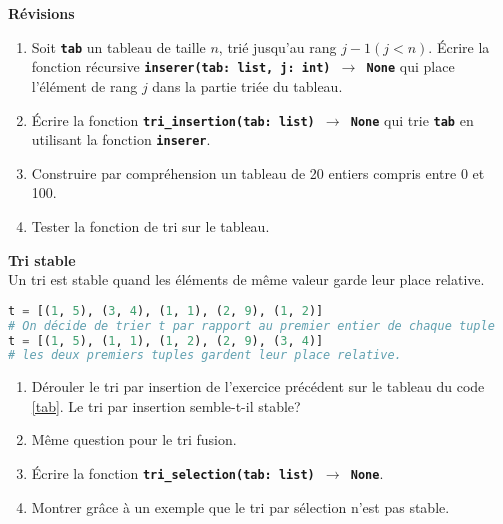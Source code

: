 \documentclass[a4paper,11pt]{article}
\begin{document}
\begin{exo}
    \textbf{Révisions}
    \begin{enumerate}
        \item Soit \textbf{\texttt{tab}} un tableau de taille $n$, trié jusqu'au rang $j-1 (j<n)$. Écrire la fonction récursive \textbf{\texttt{inserer(tab: list, j: int) $\rightarrow$ None}} qui place l'élément de rang $j$ dans la partie triée du tableau.
        \item Écrire la fonction \textbf{\texttt{tri\_insertion(tab: list) $\rightarrow$ None}} qui trie \textbf{\texttt{tab}} en utilisant la fonction \textbf{\texttt{inserer}}.
        \item Construire par compréhension un tableau de 20 entiers compris entre 0 et 100.
        \item Tester la fonction de tri sur le tableau.
    \end{enumerate}
\end{exo}
\begin{exo}
    \textbf{Tri stable}\\ Un tri est stable quand les éléments de même valeur garde leur place relative.
    \begin{center}
        \begin{lstlisting}[language=Python  , xleftmargin=2em, xrightmargin=2em]
t = [(1, 5), (3, 4), (1, 1), (2, 9), (1, 2)]
# On décide de trier t par rapport au premier entier de chaque tuple
t = [(1, 5), (1, 1), (1, 2), (2, 9), (3, 4)]
# les deux premiers tuples gardent leur place relative.
\end{lstlisting}
        \label{tab}
    \end{center}
    \begin{enumerate}
        \item Dérouler le tri par insertion de l'exercice précédent sur le tableau du code \ref{tab}. Le tri par insertion semble-t-il stable?
        \item Même question pour le tri fusion.
        \item Écrire la fonction \textbf{\texttt{tri\_selection(tab: list) $\rightarrow$ None}}.
        \item Montrer grâce à un exemple que le tri par sélection n'est pas stable.
    \end{enumerate}
\end{exo}
\end{document}
